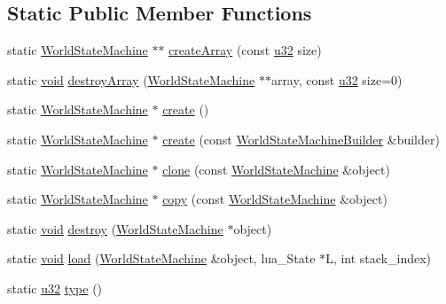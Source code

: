 \subsection*{Static Public Member Functions}
\begin{DoxyCompactItemize}
\item 
static \mbox{\hyperlink{classnjli_1_1_world_state_machine}{World\+State\+Machine}} $\ast$$\ast$ \mbox{\hyperlink{classnjli_1_1_world_state_machine_a9cd827ef35493760200956179fd35bcd}{create\+Array}} (const \mbox{\hyperlink{_util_8h_a10e94b422ef0c20dcdec20d31a1f5049}{u32}} size)
\item 
static \mbox{\hyperlink{_thread_8h_af1e856da2e658414cb2456cb6f7ebc66}{void}} \mbox{\hyperlink{classnjli_1_1_world_state_machine_a45ee6a98dd7369769fede029d6e09e96}{destroy\+Array}} (\mbox{\hyperlink{classnjli_1_1_world_state_machine}{World\+State\+Machine}} $\ast$$\ast$array, const \mbox{\hyperlink{_util_8h_a10e94b422ef0c20dcdec20d31a1f5049}{u32}} size=0)
\item 
static \mbox{\hyperlink{classnjli_1_1_world_state_machine}{World\+State\+Machine}} $\ast$ \mbox{\hyperlink{classnjli_1_1_world_state_machine_a2ea736b13cbb1aa35788809869a480d9}{create}} ()
\item 
static \mbox{\hyperlink{classnjli_1_1_world_state_machine}{World\+State\+Machine}} $\ast$ \mbox{\hyperlink{classnjli_1_1_world_state_machine_aa57a3c28f3c169d27affa3a515539734}{create}} (const \mbox{\hyperlink{classnjli_1_1_world_state_machine_builder}{World\+State\+Machine\+Builder}} \&builder)
\item 
static \mbox{\hyperlink{classnjli_1_1_world_state_machine}{World\+State\+Machine}} $\ast$ \mbox{\hyperlink{classnjli_1_1_world_state_machine_abea6c586a4d932fcecfb18ac6aa657ca}{clone}} (const \mbox{\hyperlink{classnjli_1_1_world_state_machine}{World\+State\+Machine}} \&object)
\item 
static \mbox{\hyperlink{classnjli_1_1_world_state_machine}{World\+State\+Machine}} $\ast$ \mbox{\hyperlink{classnjli_1_1_world_state_machine_a5681a372a589ecaa3fb096b9fdcafc2e}{copy}} (const \mbox{\hyperlink{classnjli_1_1_world_state_machine}{World\+State\+Machine}} \&object)
\item 
static \mbox{\hyperlink{_thread_8h_af1e856da2e658414cb2456cb6f7ebc66}{void}} \mbox{\hyperlink{classnjli_1_1_world_state_machine_ab9dd49b28f0217cb0d67f30b88c692e6}{destroy}} (\mbox{\hyperlink{classnjli_1_1_world_state_machine}{World\+State\+Machine}} $\ast$object)
\item 
static \mbox{\hyperlink{_thread_8h_af1e856da2e658414cb2456cb6f7ebc66}{void}} \mbox{\hyperlink{classnjli_1_1_world_state_machine_a7d998f8840f82b74deaa564aa89d7d44}{load}} (\mbox{\hyperlink{classnjli_1_1_world_state_machine}{World\+State\+Machine}} \&object, lua\+\_\+\+State $\ast$L, int stack\+\_\+index)
\item 
static \mbox{\hyperlink{_util_8h_a10e94b422ef0c20dcdec20d31a1f5049}{u32}} \mbox{\hyperlink{classnjli_1_1_world_state_machine_a89f24e7eea9edc502aa7a91549c72adc}{type}} ()
\end{DoxyCompactItemize}
